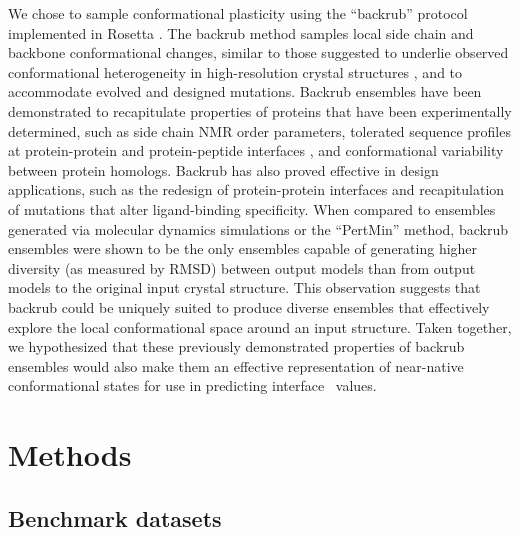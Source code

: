 We chose to sample conformational plasticity using the ``backrub'' protocol implemented in Rosetta \cite{smith_backrub-like_2008}.
The backrub method samples local side chain and backbone conformational changes, similar to those suggested to underlie observed conformational heterogeneity in high-resolution crystal structures \cite{davis_backrub_2006}, and to accommodate evolved and designed mutations\cite{keedy_role_2012}.
Backrub ensembles have been demonstrated to recapitulate properties of proteins that have been experimentally determined, such as side chain NMR order parameters\cite{friedland_simple_2008}, tolerated sequence profiles at protein-protein \cite{humphris_prediction_2008} and protein-peptide interfaces \cite{smith_structure-based_2010,smith_predicting_2011}, and conformational variability between protein homologs\cite{schenkelberg_protein_2016}.
Backrub has also proved effective in design applications, such as the redesign of protein-protein interfaces\cite{kapp_control_2012} and recapitulation of mutations that alter ligand-binding specificity\cite{ollikainen_coupling_2015}.
When compared to ensembles generated via molecular dynamics simulations or the ``PertMin'' method\cite{davey_improving_2014}, backrub ensembles were shown to be the only ensembles capable of generating higher diversity (as measured by RMSD) between output models than from output models to the original input crystal structure.
This observation suggests that backrub could be uniquely suited to produce diverse ensembles that effectively explore the local conformational space around an input structure.\cite{davey_improving_2014}
Taken together, we hypothesized that these previously demonstrated properties of backrub ensembles would also make them an effective representation of near-native conformational states for use in predicting interface \ddg\ values.

\section{Methods}

\subsection{Benchmark datasets}


